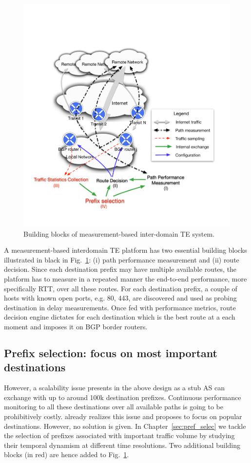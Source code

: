 \begin{figure}[!htb]
\centering
\includegraphics[width=\textwidth]{gfx/chap1/archi.pdf}
\caption{Building blocks of measurement-based inter-domain TE system.}
\label{fig:archi}
\end{figure}

A measurement-based interdomain TE platform has two essential building blocks illustrated in black in Fig.~\ref{fig:archi}: (i) path performance measurement and (ii) route decision.
Since each destination prefix may have multiple available routes, the platform has to measure in a repeated manner the end-to-end performance, more specifically \ac{RTT}, over all these routes. 
For each destination prefix, a couple of hosts with known open ports, e.g. 80, 443, are discovered and used as probing destination in delay measurements.
Once fed with performance metrics, route decision engine dictates for each destination which is the best route at a each moment and imposes it on BGP border routers.

\subsection{Prefix selection: focus on most important destinations}
However, a scalability issue presents in the above design as a stub AS can exchange with up to around 100k destination prefixes.
Continuous performance monitoring to all these destinations over all available paths is going to be prohibitively costly.
\citet{Feamster2003} already realizes this issue and proposes to focus on popular destinations.
However, no solution is given.
In Chapter~\ref{sec:pref_selec} we tackle the selection of prefixes associated with important traffic volume by studying their temporal dynamism at different time resolutions. Two additional building blocks (in red) are hence added to Fig.~\ref{fig:archi}.

